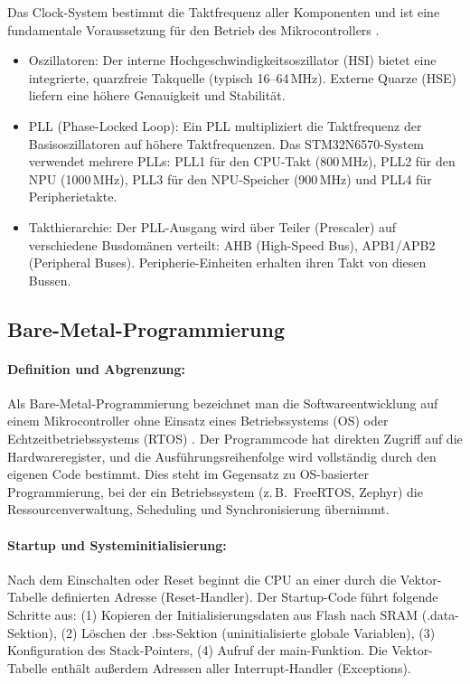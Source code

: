 Das Clock-System bestimmt die Taktfrequenz aller Komponenten und ist eine fundamentale Voraussetzung für den Betrieb des Mikrocontrollers \cite[S. ~411 ff.]{STM32N6570DKProductSTMicroelectronics, rm0486}.

\begin{itemize}
    \item Oszillatoren: Der interne Hochgeschwindigkeitsoszillator (HSI) bietet eine integrierte, quarzfreie Takquelle (typisch 16--64\,MHz). Externe Quarze (HSE) liefern eine höhere Genauigkeit und Stabilität.
    \item PLL (Phase-Locked Loop): Ein PLL multipliziert die Taktfrequenz der Basisoszillatoren auf höhere Taktfrequenzen. Das STM32N6570-System verwendet mehrere PLLs: PLL1 für den CPU-Takt (800\,MHz), PLL2 für den NPU (1000\,MHz), PLL3 für den NPU-Speicher (900\,MHz) und PLL4 für Peripherietakte.
    \item Takthierarchie: Der PLL-Ausgang wird über Teiler (Prescaler) auf verschiedene Busdomänen verteilt: AHB (High-Speed Bus), APB1/APB2 (Peripheral Buses). Peripherie-Einheiten erhalten ihren Takt von diesen Bussen.
\end{itemize}

\subsection{Bare-Metal-Programmierung}\label{sub:bare-metal}

\paragraph{Definition und Abgrenzung:}
Als Bare-Metal-Programmierung bezeichnet man die Softwareentwicklung auf einem Mikrocontroller ohne Einsatz eines Betriebssystems (OS) oder Echtzeitbetriebssystems (RTOS) \cite[Kap. ~2]{GbatiIsrael2024BECP}. Der Programmcode hat direkten Zugriff auf die Hardwareregister, und die Ausführungsreihenfolge wird vollständig durch den eigenen Code bestimmt. Dies steht im Gegensatz zu OS-basierter Programmierung, bei der ein Betriebssystem (z.\,B.\ FreeRTOS, Zephyr) die Ressourcenverwaltung, Scheduling und Synchronisierung übernimmt.

\paragraph{Startup und Systeminitialisierung:}
Nach dem Einschalten oder Reset beginnt die CPU an einer durch die Vektor-Tabelle definierten Adresse (Reset-Handler). Der Startup-Code führt folgende Schritte aus: (1) Kopieren der Initialisierungsdaten aus Flash nach SRAM (.data-Sektion), (2) Löschen der .bss-Sektion (uninitialisierte globale Variablen), (3) Konfiguration des Stack-Pointers, (4) Aufruf der main-Funktion. Die Vektor-Tabelle enthält außerdem Adressen aller Interrupt-Handler (Exceptions).

